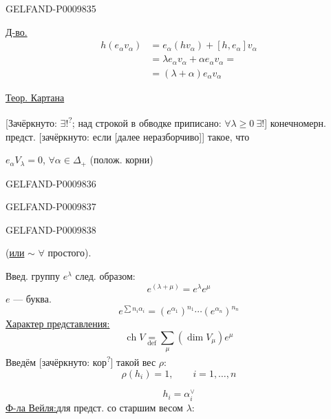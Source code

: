 \begin{GelfandAdjacentEvidence}{GELFAND-P000983}{5}


\underline{Д-во.}
\begin{align*}
h(e_\alpha v_\alpha)
 &=e_\alpha(hv_\alpha)+[h,e_\alpha]v_\alpha\\
 &=\lambda e_\alpha v_\alpha+\alpha e_\alpha v_\alpha=\\
 &=(\lambda+\alpha)e_\alpha v_\alpha
\end{align*}

\underline{Теор. Картана}

[Зачёркнуто: $\exists!$\textsuperscript{?}; над строкой в обводке приписано: $\forall\lambda\geq0\ \exists!$] конечномерн. предст. [зачёркнуто: если [далее неразборчиво]] такое, что

$e_\alpha V_\lambda=0$, $\forall\alpha\in\Delta_+$ (полож. корни)
\end{GelfandAdjacentEvidence}
\begin{GelfandAdjacentEvidence}{GELFAND-P000983}{6}

\end{GelfandAdjacentEvidence}
\begin{GelfandAdjacentEvidence}{GELFAND-P000983}{7}

\end{GelfandAdjacentEvidence}
\begin{GelfandAdjacentEvidence}{GELFAND-P000983}{8}


(\underline{или} $\sim$ $\forall$ простого).

Введ. группу $e^\lambda$ след. образом:
\[
e^{(\lambda+\mu)}=e^\lambda e^\mu
\]
$e$ --- буква.
\[
e^{\sum n_i\alpha_i}=(e^{\alpha_1})^{n_1}\cdots(e^{\alpha_n})^{n_n}
\]
\underline{Характер представления:}
\[
\operatorname{ch}V\underset{\mathrm{def}}{=}\sum_\mu(\dim V_\mu)e^\mu
\]
Введём [зачёркнуто: кор\textsuperscript{?}] такой вес $\rho$:
\[
\rho(h_i)=1,\qquad i=1,\ldots,n
\]
\end{GelfandAdjacentEvidence}

\[
h_i=\alpha_i^{\vee}
\]
\underline{Ф-ла Вейля:}\qquad для предст. со старшим весом $\lambda$:


